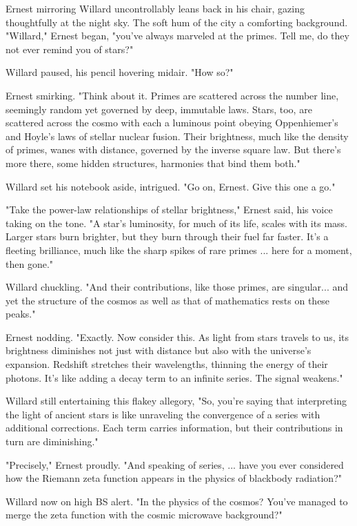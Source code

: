 Ernest mirroring Willard uncontrollably leans back in his chair, gazing thoughtfully at the night sky. The soft hum of the city a comforting background. "Willard," Ernest began, "you’ve always marveled at the primes. Tell me, do they not ever remind you of stars?"

Willard paused, his pencil hovering midair. "How so?"

Ernest smirking. "Think about it. Primes are scattered across the number line, seemingly random yet governed by deep, immutable laws. Stars, too, are scattered across the cosmo with each a luminous point obeying Oppenhiemer's and Hoyle's laws of stellar nuclear fusion. Their brightness, much like the density of primes, wanes with distance, governed by the inverse square law. But there’s more there, some hidden structures, harmonies that bind them both."

Willard set his notebook aside, intrigued. "Go on, Ernest. Give this one a go."

"Take the power-law relationships of stellar brightness," Ernest said, his voice taking on the tone. "A star’s luminosity, for much of its life, scales with its mass. Larger stars burn brighter, but they burn through their fuel far faster. It’s a fleeting brilliance, much like the sharp spikes of rare primes ... here for a moment, then gone."

Willard chuckling. "And their contributions, like those primes, are singular... and yet the structure of the cosmos as well as that of mathematics rests on these peaks."

Ernest nodding. "Exactly. Now consider this. As light from stars travels to us, its brightness diminishes not just with distance but also with the universe’s expansion. Redshift stretches their wavelengths, thinning the energy of their photons. It’s like adding a decay term to an infinite series. The signal weakens."

Willard still entertaining this flakey allegory, "So, you're saying that interpreting the light of ancient stars is like unraveling the convergence of a series with additional corrections. Each term carries information, but their contributions in turn are diminishing."

"Precisely," Ernest proudly. "And speaking of series, ... have you ever considered how the Riemann zeta function appears in the physics of blackbody radiation?"

Willard now on high BS alert. "In the physics of the cosmos? You’ve managed to merge the zeta function with the cosmic microwave background?"

